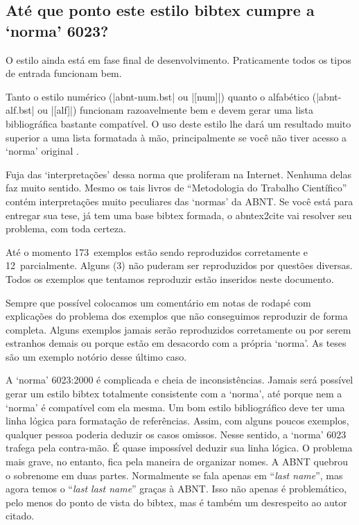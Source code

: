 \documentclass[a4paper]{ltxdoc}
\newcommand{\OKs}{173}
\newcommand{\quaseOKs}{12}
\newcommand{\nadaOK}{3}
\begin{document}
\subsection{Até que ponto este estilo \textsf{bibtex} cumpre a `norma' 6023?}

O estilo ainda está em fase final de desenvolvimento. Praticamente
todos os tipos de entrada funcionam bem.

Tanto o estilo numérico (|abnt-num.bst| ou |[num]|) quanto o alfabético
(|abnt-alf.bst| ou |[alf]|) funcionam razoavelmente bem e devem
gerar uma lista bibliográfica bastante compatível. O uso deste estilo lhe dará
um resultado muito superior a uma lista formatada à mão, principalmente se você
não tiver acesso a `norma' original \cite{NBR6023:2000}.

Fuja das `interpretações' dessa norma que proliferam na Internet. Nenhuma delas
faz muito sentido. Mesmo os tais livros de ``Metodologia do Trabalho
Científico'' contém interpretações muito peculiares das `normas' da ABNT.
Se você está para entregar sua tese, já tem uma base \textsf{bibtex} formada,
o \textsf{abntex2cite} vai resolver seu problema, com toda certeza.

Até o momento \OKs\ exemplos estão sendo reproduzidos corretamente e \quaseOKs\
parcialmente. Alguns (\nadaOK) não puderam ser reproduzidos por questões
diversas. Todos os exemplos que tentamos reproduzir estão inseridos neste
documento.

Sempre que possível colocamos um comentário em notas de rodapé com explicações
do problema dos exemplos que não conseguimos reproduzir de forma completa.
Alguns exemplos jamais serão reproduzidos corretamente ou por serem estranhos
demais ou porque estão em desacordo com a própria `norma'. As teses são um
exemplo notório desse último caso.

A `norma' 6023:2000 \cite{NBR6023:2000} é complicada e cheia de inconsistências.
Jamais será possível gerar um estilo \textsf{bibtex} totalmente consistente com
a `norma', até porque nem a `norma' é compatível com ela mesma. Um bom estilo bibliográfico
deve ter uma linha lógica para formatação de referências. Assim, com alguns
poucos exemplos, qualquer pessoa poderia deduzir os casos omissos. Nesse
sentido, a `norma' 6023 trafega pela contra-mão. É quase impossível deduzir sua
linha lógica. O problema mais grave, no entanto, fica pela maneira de organizar
nomes. A ABNT quebrou o sobrenome em duas partes. Normalmente se fala apenas em
``\textit{last name}'', mas agora temos o ``\textit{last last name}'' graças à
ABNT. Isso não apenas é problemático, pelo menos do ponto de vista do
\textsf{bibtex}, mas é também um desrespeito ao autor citado.
\end{document}
